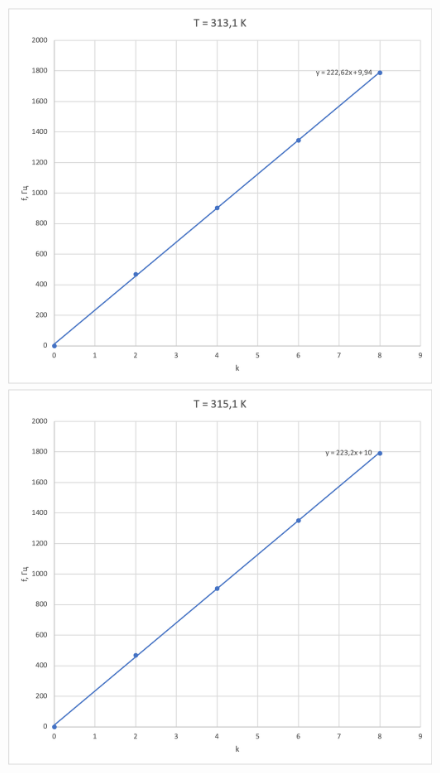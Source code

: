 \documentclass[a4paper, 12pt]{article}
\begin{document}
\begin{enumerate}
\begin{figure}[ph]
\begin{minipage}[h]{0.5\linewidth}
            \end{minipage}
            \vfill
            \begin{minipage}[h]{0.5\linewidth}
                \includegraphics[width=1\linewidth]{9.png}    
            \end{minipage}
            \hfill
            \begin{minipage}[h]{0.5\linewidth}
                \includegraphics[width=1\linewidth]{10.png}    

\end{minipage}
\end{figure}
\end{enumerate}
\end{document}
